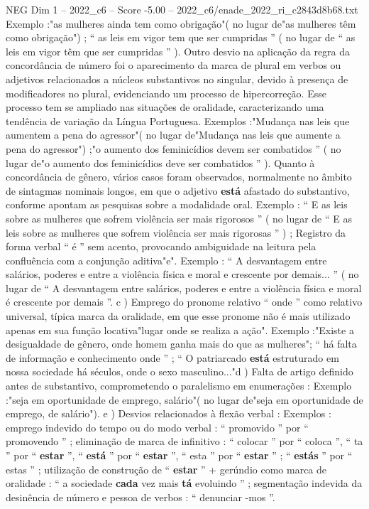 \begin{textsample}{NEG Dim 1 – 2022\_c6 – Score -5.00 – 2022\_c6/enade\_2022\_ri\_c2843d8b68.txt}
Exemplo :"as mulheres ainda tem como obrigação"( no lugar de"as mulheres têm como obrigação") ; “ as leis em vigor tem que ser cumpridas ” ( no lugar de “ as leis em vigor têm que ser cumpridas ” ).
Outro desvio na aplicação da regra da concordância de número foi o aparecimento da marca de plural em verbos ou adjetivos relacionados a núcleos substantivos no singular, devido à presença de modificadores no plural, evidenciando um processo de hipercorreção.
Esse processo tem se ampliado nas situações de oralidade, caracterizando uma tendência de variação da Língua Portuguesa.
Exemplos :"Mudança nas leis que aumentem a pena do agressor"( no lugar de"Mudança nas leis que aumente a pena do agressor") ;"o aumento dos feminicídios devem ser combatidos ” ( no lugar de"o aumento dos feminicídios deve ser combatidos ” ).
Quanto à concordância de gênero, vários casos foram observados, normalmente no âmbito de sintagmas nominais longos, em que o adjetivo \textbf{está} afastado do substantivo, conforme apontam as pesquisas sobre a modalidade oral.
Exemplo : “ E as leis sobre as mulheres que sofrem violência ser mais rigorosos ” ( no lugar de “ E as leis sobre as mulheres que sofrem violência ser mais rigorosas ” ) ; Registro da forma verbal “ é ” sem acento, provocando ambiguidade na leitura pela confluência com a conjunção aditiva"e".
Exemplo : “ A desvantagem entre salários, poderes e entre a violência física e moral e crescente por demais... ” ( no lugar de “ A desvantagem entre salários, poderes e entre a violência física e moral é crescente por demais ”. c ) Emprego do pronome relativo “ onde ” como relativo universal, típica marca da oralidade, em que esse pronome não é mais utilizado apenas em sua função locativa"lugar onde se realiza a ação".
Exemplo :"Existe a desigualdade de gênero, onde homem ganha mais do que as mulheres"; “ há falta de informação e conhecimento onde ” ; “ O patriarcado \textbf{está} estruturado em nossa sociedade há séculos, onde o sexo masculino..."d ) Falta de artigo definido antes de substantivo, comprometendo o paralelismo em enumerações : Exemplo :"seja em oportunidade de emprego, salário"( no lugar de"seja em oportunidade de emprego, de salário"). e ) Desvios relacionados à flexão verbal : Exemplos : emprego indevido do tempo ou do modo verbal : “ promovido ” por “ promovendo ” ; eliminação de marca de infinitivo : “ colocar ” por “ coloca ”, “ ta ” por “ \textbf{estar} ”, “ \textbf{está} ” por “ \textbf{estar} ”, “ esta ” por “ \textbf{estar} ” ; “ \textbf{estás} ” por “ estas ” ; utilização de construção de “ \textbf{estar} ” + gerúndio como marca de oralidade : “ a sociedade \textbf{cada} vez mais \textbf{tá} evoluindo ” ; segmentação indevida da desinência de número e pessoa de verbos : “ denunciar -mos ”.

\end{textsample}
